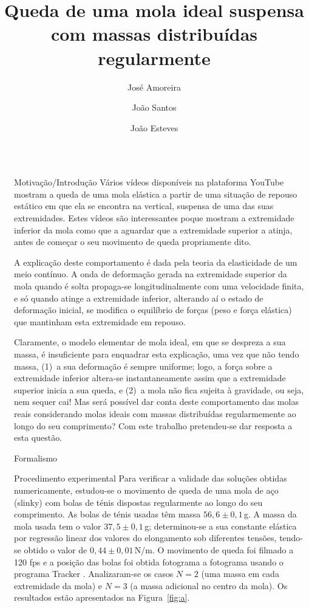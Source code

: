 \documentclass[final]{beamer}
\title{Queda de uma mola ideal suspensa com massas distribuídas regularmente}
\author{José Amoreira \inst{1,2,3} \and João Santos \inst{2} \and João Esteves \inst{2}}
\institute[]{\inst{1} Laboratório de Instrumentação e Física Experimental de Partículas \and  \inst{2}Universidade da Beira Interior  \samelineand \inst{3} Centro de Matemática e Aplicações}
\newlength{\sepwidth}
\newlength{\colwidth}
\newcommand{\separatorcolumn}{\begin{column}{\sepwidth}\end{column}}
\begin{document}
\begin{frame}[t]
\begin{columns}[t]
\separatorcolumn
\begin{column}{\colwidth}
\begin{exampleblock}{Motivação/Introdução}
  Vários vídeos disponíveis na plataforma YouTube mostram a queda de uma mola
  elástica a partir de uma situação de repouso estático em que ela se encontra
  na vertical, suspensa de uma das suas extremidades. Estes vídeos são
  interessantes poque mostram a extremidade inferior da mola como que a aguardar
  que a extremidade superior a atinja, antes de começar o seu movimento de queda
  propriamente dito. 
	
  A explicação deste comportamento é dada pela teoria da elasticidade de um meio
  contínuo. A onda de deformação gerada na extremidade superior da mola quando é
  solta propaga-se longitudinalmente com uma velocidade finita, e só quando
  atinge a extremidade inferior, alterando aí o estado de deformação inicial, se
  modifica o equilíbrio de forças (peso e força elástica) que mantinham esta
  extremidade em repouso.
	
  Claramente, o modelo elementar de mola ideal, em que se despreza a sua massa,
  é insuficiente para enquadrar esta explicação, uma vez que não tendo massa,
  (1)~a sua deformação é sempre uniforme; logo, a força sobre a extremidade
  inferior altera-se instantaneamente assim que a extremidade superior inicia a
  sua queda, e (2)~a mola não fica sujeita à gravidade, ou seja, nem sequer cai!
  Mas será possível dar conta deste comportamento das molas reais considerando
  molas ideais com massas distribuídas regularmemente ao longo do seu
  comprimento? Com este trabalho pretendeu-se dar resposta a esta questão.
\end{exampleblock}
\begin{block}{Formalismo}
	\vspace{1cm}
	
\end{block}
\begin{block}{Procedimento experimental}
Para verificar a validade das soluções obtidas numericamente, estudou-se o
movimento de queda de uma mola de aço (slinky) com bolas de ténis dispostas
regularmente ao longo do seu comprimento.  As bolas de ténis usadas têm massa
$56,6\pm0,1$\,g.  A massa da mola usada tem o valor $37,5\pm0,1$\,g;
determinou-se a sua constante elástica por regressão linear dos valores do
elongamento sob diferentes tensões, tendo-se obtido o valor de
$0,44\pm0,01$\,N/m.  O movimento de queda foi filmado a 120 fps e a posição das
bolas foi obtida fotograma a fotograma usando o programa Tracker \cite{Tracker}.
Analizaram-se os casos $N=2$ (uma massa em cada extremidade da mola) e $N=3$ (a
massa adicional no centro da mola). Os resultados estão apresentados na
Figura~\ref{fig:a}.


\end{block}
\end{column}
\end{columns}
\end{frame}
\end{document}
